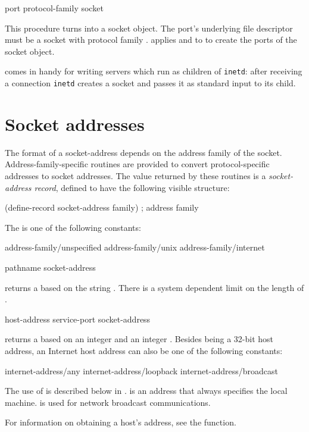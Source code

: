  {port protocol-family} {socket}
\begin{desc}
  This procedure turns  into a socket object. The port's
  underlying file descriptor must be a socket with protocol family
  .  applies 
  and  to  to create the ports of the
  socket object.
  
   comes in handy for writing
  servers which run as children of \texttt{inetd}: after receiving a
  connection \texttt{inetd} creates a socket and passes it as
  standard input to its child.
\end{desc}

\section{Socket addresses}

The format of a socket-address depends on the address family of the
socket. Address-family-specific routines are provided to convert
protocol-specific addresses to socket addresses. The value returned by
these routines is a \emph{socket-address record}, defined to have the
following visible structure:
\begin{code}
(define-record socket-address
  family)                               ; address family\end{code}

The  is one of the following constants:
\begin{code}\codeallowbreaks
address-family/unspecified
address-family/unix
address-family/internet\end{code}

 {pathname} {socket-address}
\begin{desc}
 returns a  based
on the string . There is a system dependent limit on the
length of .
\end{desc}

 {host-address service-port} {socket-address}
\begin{desc}
 returns a  based
on an integer  and an integer .
Besides being a 32-bit host address, an Internet host address can also
be one of the following constants:
\begin{code}\codeallowbreaks
internet-address/any
internet-address/loopback
internet-address/broadcast\end{code}

The use of  is described below in
.  is an address that
always specifies the local machine.  is
used for network broadcast communications.

For information on obtaining a host's address, see the 
function. 
\end{desc}

